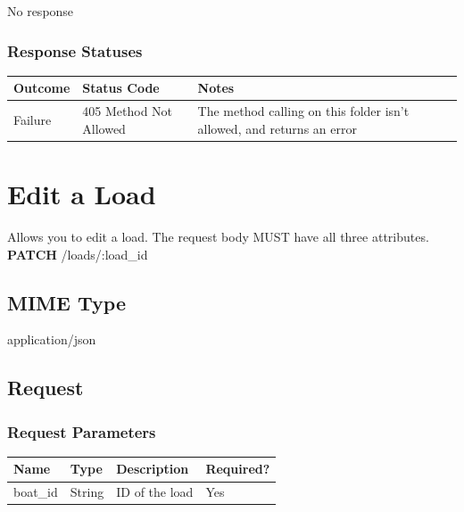 \documentclass[letterpaper,11pt,titlepage,draftclsnofoot,onecolumn,compsoc,utf8,latin1]{IEEEtran}
\begin{document}
\begin{singlespace}
No response

\subsubsection{Response Statuses}

\begin{center}
\begin{tabular}{ |p{}|p{}|p{}| } 
 \hline
 \textbf{Outcome} & \textbf{Status Code} & \textbf{Notes}  \\  \hline
 Failure & 405 Method Not Allowed & The method calling on this folder isn't allowed, and returns an error \\
 \hline
\end{tabular}
\end{center}

\normalsize

\newpage

\section{Edit a Load}

Allows you to edit a load. The request body MUST have all three attributes.\\

\noindent \textbf{PATCH} /loads/:load\_id

\subsection{MIME Type}

application/json

\subsection{Request}

\subsubsection{Request Parameters}

\begin{center}
    \begin{tabular}{ | p{} | p{} | p{} | p{} |}
    \hline
        \textbf{Name} & \textbf{Type} & \textbf{Description} &\textbf{Required?}  \\ \hline
        boat\_id & String & ID of the load & Yes \\
    \hline
    \end{tabular}
\end{center}

\end{singlespace}
\end{document}
